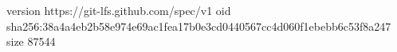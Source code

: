 version https://git-lfs.github.com/spec/v1
oid sha256:38a4a4eb2b58e974e69ac1fea17b0e3cd0440567cc4d060f1ebebb6c53f8a247
size 87544
